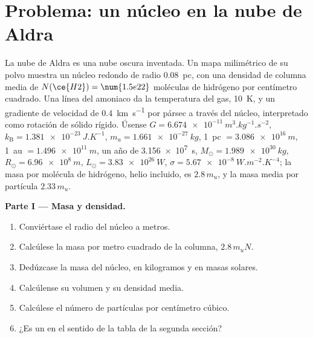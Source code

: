 \section{Problema: un núcleo en la nube de Aldra}

\begin{problem}
\label{pb:b2:ism-star-formation:1}
La nube de Aldra es una nube oscura inventada. Un mapa milimétrico de su polvo
muestra un núcleo redondo de radio \qty{0.08}{pc}, con una densidad de columna media de
$N(\ce{H2}) = \num{1.5e22}$ moléculas de hidrógeno por centímetro cuadrado. Una
línea del amoniaco da la temperatura del gas, \qty{10}{K}, y un gradiente de
velocidad de \qty{0.4}{km.s^{-1}} por pársec a través del núcleo, interpretado como rotación
de sólido rígido. Úsense $G = \qty{6.674e-11}{m^3.kg^{-1}.s^{-2}}$,
$k_{\mathrm B} = \qty{1.381e-23}{J.K^{-1}}$, $m_u = \qty{1.661e-27}{kg}$,
\qty{1}{pc} $= \qty{3.086e16}{m}$, \qty{1}{au} $= \qty{1.496e11}{m}$, un año de
\qty{3.156e7}{s}, $M_\odot = \qty{1.989e30}{kg}$, $R_\odot = \qty{6.96e8}{m}$,
$L_\odot = \qty{3.83e26}{W}$, $\sigma = \qty{5.67e-8}{W.m^{-2}.K^{-4}}$; la
masa por molécula de hidrógeno, helio incluido, es $2.8\,m_u$, y la masa media
por partícula $2.33\,m_u$.

\medskip
\noindent\textbf{Parte I --- Masa y densidad.}
\begin{enumerate}
  \item Conviértase el radio del núcleo a metros.
  \item Calcúlese la masa por metro cuadrado de la columna, $2.8\,m_u N$.
  \item Dedúzcase la masa del núcleo, en kilogramos y en masas solares.
  \item Calcúlense su volumen y su densidad media.
  \item Calcúlese el número de partículas por centímetro cúbico.
  \item ¿Es un  en el sentido de la tabla de la segunda sección?
\end{enumerate}


\end{problem}
